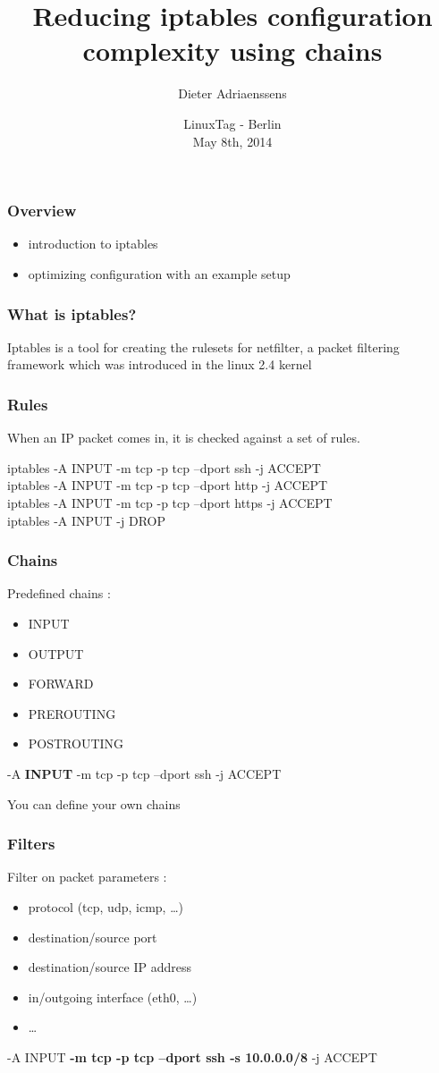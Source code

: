 \documentclass[14pt]{beamer}
\title[Reduce iptables config complexity]{Reducing iptables configuration complexity using chains}
\author{Dieter Adriaenssens}
\institute[UGent]{Ghent University, Belgium}
\date[LinuxTag 8May2014]{LinuxTag - Berlin\\
May 8th, 2014}
\begin{document}
  \begin{frame}
  \titlepage
  \end{frame}
  \begin{frame}
    \frametitle{Overview}
    \begin{itemize}
      \item introduction to iptables
      \item optimizing configuration with an example setup
    \end{itemize}
  \end{frame}
  \begin{frame}
    \frametitle{What is iptables?}
    Iptables is a tool for creating the rulesets for netfilter, a packet filtering framework which was introduced in the linux 2.4 kernel
  \end{frame}
  \begin{frame}
    \frametitle{Rules}
    When an IP packet comes in, it is checked against a set of rules.
    \begin{example}
      \small{iptables -A INPUT -m tcp -p tcp --dport ssh -j ACCEPT\\
      iptables -A INPUT -m tcp -p tcp --dport http -j ACCEPT\\
      iptables -A INPUT -m tcp -p tcp --dport https -j ACCEPT\\
      iptables -A INPUT -j DROP}
    \end{example}
  \end{frame}
  \begin{frame}
    \frametitle{Chains}
    Predefined chains :
    \begin{itemize}
      \item INPUT
      \item OUTPUT
      \item FORWARD
      \item PREROUTING
      \item POSTROUTING
    \end{itemize}
    \begin{example}
      \small{-A \textbf{INPUT} -m tcp -p tcp --dport ssh -j ACCEPT}
    \end{example}
    You can define your own chains
  \end{frame}
  \begin{frame}
    \frametitle{Filters}
    Filter on packet parameters :
    \begin{itemize}
      \item protocol (tcp, udp, icmp, \ldots)
      \item destination/source port
      \item destination/source IP address
      \item in/outgoing interface (eth0, \ldots)
      \item \ldots
    \end{itemize}
    \begin{example}
      \small{-A INPUT \textbf{-m tcp -p tcp --dport ssh -s 10.0.0.0/8} -j ACCEPT}
    \end{example}
  \end{frame}
\end{document}

